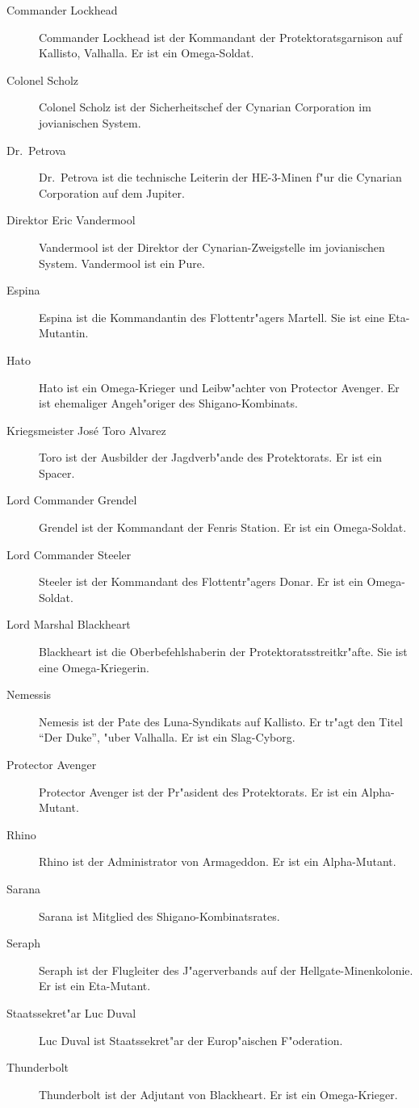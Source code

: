 \begin{description}
\item [Commander Lockhead] Commander Lockhead ist der Kommandant der Protektoratsgarnison auf Kallisto, Valhalla. Er ist ein Omega-Soldat.
\item [Colonel Scholz] Colonel Scholz ist der Sicherheitschef der Cynarian Corporation im jovianischen System.
\item [Dr.~Petrova] Dr.~Petrova ist die technische Leiterin der HE-3-Minen f"ur die Cynarian Corporation auf dem Jupiter.
\item [Direktor Eric Vandermool]  Vandermool ist der Direktor der Cynarian-Zweigstelle im jovianischen System. Vandermool ist ein Pure.
\item [Espina] Espina ist die Kommandantin des Flottentr"agers Martell. Sie ist eine Eta-Mutantin.
\item [Hato] Hato ist ein Omega-Krieger und Leibw"achter von Protector Avenger. Er ist ehemaliger Angeh"origer des Shigano-Kombinats.
\item [Kriegsmeister Jos\'{e} \frqq{}Toro\flqq{} Alvarez] Toro ist der Ausbilder der Jagdverb"ande des Protektorats. Er ist ein Spacer.
\item [Lord Commander Grendel] Grendel ist der Kommandant der Fenris Station. Er ist ein Omega-Soldat.
\item [Lord Commander Steeler] Steeler ist der Kommandant des Flottentr"agers Donar. Er ist ein Omega-Soldat.
\item [Lord Marshal Blackheart] Blackheart ist die Oberbefehlshaberin der Protektoratsstreitkr"afte. Sie ist eine Omega-Kriegerin.
\item [Nemessis] Nemesis ist der Pate des Luna-Syndikats auf Kallisto. Er tr"agt den Titel ``Der Duke'', "uber Valhalla. Er ist ein 
      Slag-Cyborg. 
\item [Protector Avenger] Protector Avenger ist der Pr"asident des Protektorats. Er ist ein Alpha-Mutant.
\item [Rhino] Rhino ist der Administrator von Armageddon. Er ist ein Alpha-Mutant.
\item [Sarana] Sarana ist Mitglied des Shigano-Kombinatsrates.
\item [Seraph] Seraph ist der Flugleiter des J"agerverbands auf der Hellgate-Minenkolonie. Er ist ein Eta-Mutant.
\item [Staatssekret"ar Luc Duval] Luc Duval ist Staatssekret"ar der Europ"aischen F"oderation.
\item [Thunderbolt] Thunderbolt ist der Adjutant von Blackheart. Er ist ein Omega-Krieger. 
\end{description}
